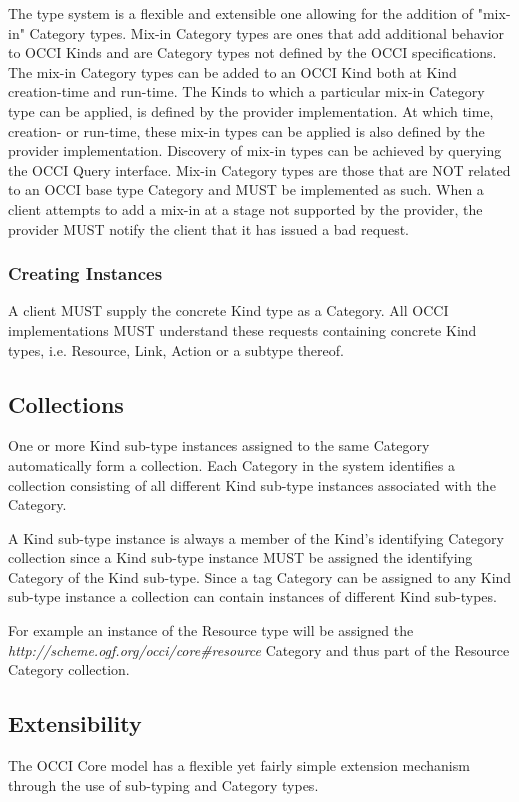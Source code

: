 \documentclass[10pt,a4paper,british]{article}
\begin{document}
The type system is a flexible and extensible one allowing for the
addition of "mix-in" Category types. Mix-in Category types are ones
that add additional behavior to OCCI Kinds and are Category types not
defined by the OCCI specifications. The mix-in Category types can be
added to an OCCI Kind both at Kind creation-time and run-time. The
Kinds to which a particular mix-in Category type can be applied, is
defined by the provider implementation. At which time, creation- or
run-time, these mix-in types can be applied is also defined by the
provider implementation. Discovery of mix-in types can be achieved by
querying the OCCI Query interface. Mix-in Category types are those
that are NOT related to an OCCI base type Category and MUST be
implemented as such. When a client attempts to add a mix-in at a stage
not supported by the provider, the provider MUST notify the client
that it has issued a bad request.

\subsubsection{Creating Instances}
A client MUST supply the concrete Kind type as a Category. All OCCI
implementations MUST understand these requests containing concrete
Kind types, i.e. Resource, Link, Action or a subtype thereof.

\subsection{Collections}
\label{sec:collection}
One or more Kind sub-type instances assigned to the same Category
automatically form a collection. Each Category in the system
identifies a collection consisting of all different Kind sub-type instances
associated with the Category.

A Kind sub-type instance is always a member of the Kind's identifying
Category collection since a Kind sub-type instance MUST be assigned the
identifying Category of the Kind sub-type.
Since a tag Category can be assigned to any Kind sub-type
instance a collection can contain instances of different Kind
sub-types.

For example an instance of the Resource type will be assigned the
\textit{http://scheme.ogf.org/occi/core\#resource} Category and thus
part of the Resource Category collection.

\subsection{Extensibility}
The OCCI Core model has a flexible yet fairly simple extension
mechanism through the use of sub-typing and Category types.
\end{document}

